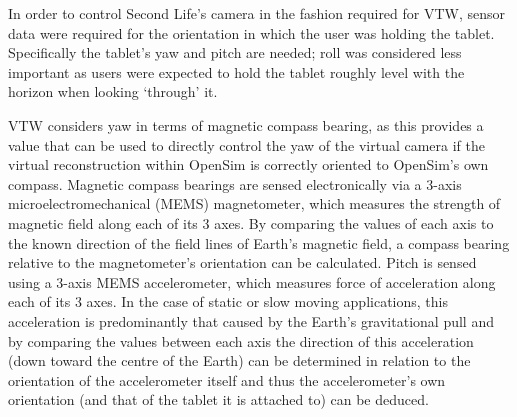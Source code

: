 \label{OrientationControl}

\newcommand{\ArduinoFootnote}{\footnote{\url{http://www.arduino.cc/}}}

\newcommand{\MMAfootnote}{\footnote{\url{http://cache.freescale.com/files/sensors/doc/data_sheet/MMA8452Q.pdf}}}

\newcommand{\ADXLfootnote}{\footnote{\url{http://www.analog.com/static/imported-files/data_sheets/ADXL335.pdf}}}

\newcommand{\HMCfootnote}{\footnote{\url{http://www51.honeywell.com/aero/common/documents/myaerospacecatalog-documents/Defense_Brochures-documents/HMC5883L_3-Axis_Digital_Compass_IC.pdf}}}

\newcommand{\HMCtwoFootnote}{\footnote{\url{http://www51.honeywell.com/aero/common/documents/myaerospacecatalog-documents/Missiles-Munitions/HMC6343.pdf}}}

\newcommand{\HMCvccFootnote}{\footnote{The HMC6343 requires 2.7 to 3.6V input on VCC/VDD, this table showing connection to 5V assumes a HMC6343 breakout with appropriate step down.}}

\newcommand{\itwocFootnote}{\footnote{The HMC6343's I2C lines must be pulled up to 3.3V, this table shows connection to an Arduino Uno R3's I2C lines which are pulled up to 5V assuming a HMC6343 breakout with appropriate level shifters.}}



In order to control Second Life's camera in the fashion required for VTW, sensor data were required for the orientation in which the user was holding the tablet. Specifically the tablet's yaw and pitch are needed; roll was considered less important as users were expected to hold the tablet roughly level with the horizon when looking `through' it.

VTW considers yaw in terms of magnetic compass bearing, as this provides a value that can be used to directly control the yaw of the virtual camera if the virtual reconstruction within OpenSim is correctly oriented to OpenSim's own compass. Magnetic compass bearings are sensed electronically via a 3-axis microelectromechanical (MEMS) magnetometer, which measures the strength of magnetic field along each of its 3 axes. By comparing the values of each axis to the known direction of the field lines of Earth's magnetic field, a compass bearing relative to the magnetometer's orientation can be calculated. Pitch is sensed using a 3-axis MEMS accelerometer, which measures force of acceleration along each of its 3 axes. In the case of static or slow moving applications, this acceleration is predominantly that caused by the Earth's gravitational pull and by comparing the values between each axis the direction of this acceleration (down toward the centre of the Earth) can be determined in relation to the orientation of the accelerometer itself and thus the accelerometer's own orientation (and that of the tablet it is attached to) can be deduced.

